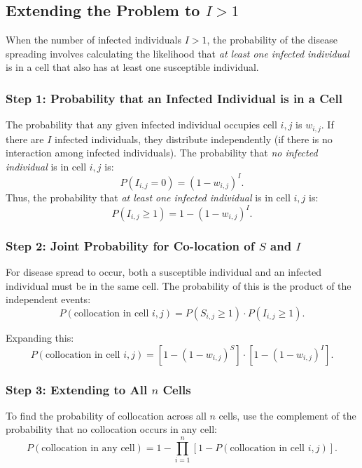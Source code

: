 \documentclass[11pt]{article}
\begin{document}
\subsection{Extending the Problem to $I > 1$}

When the number of infected individuals $I > 1$, the probability of the disease spreading involves calculating the likelihood that \emph{at least one infected individual} is in a cell that also has at least one susceptible individual.
\subsubsection*{Step 1: Probability that an Infected Individual is in a Cell}
The probability that any given infected individual occupies cell $i,j$ is $w_{i,j}$. If there are $I$ infected individuals, they distribute independently (if there is no interaction among infected individuals). The probability that \emph{no infected individual} is in cell $i,j$ is:
\begin{equation}
P(I_{i,j} = 0) = (1 - w_{i,j})^I.
\end{equation}
Thus, the probability that \emph{at least one infected individual} is in cell $i,j$ is:
\begin{equation}
P(I_{i,j} \geq 1) = 1 - (1 - w_{i,j})^I.
\end{equation}

\subsubsection*{Step 2: Joint Probability for Co-location of $S$ and $I$}
For disease spread to occur, both a susceptible individual and an infected individual must be in the same cell. The probability of this is the product of the independent events:
\begin{equation}
P(\text{collocation in cell } i,j) = P(S_{i,j} \geq 1) \cdot P(I_{i,j} \geq 1).
\end{equation}

Expanding this:
\begin{equation}
P(\text{collocation in cell } i,j) = \left[ 1 - (1 - w_{i,j})^S \right] \cdot \left[ 1 - (1 - w_{i,j})^I \right].
\end{equation}

\subsubsection*{Step 3: Extending to All $n$ Cells}
To find the probability of collocation across all $n$ cells, use the complement of the probability that no collocation occurs in any cell:
\begin{equation}
P(\text{collocation in any cell}) = 1 - \prod_{i=1}^n \left[ 1 - P(\text{collocation in cell } i,j) \right].
\end{equation}
\end{document}
